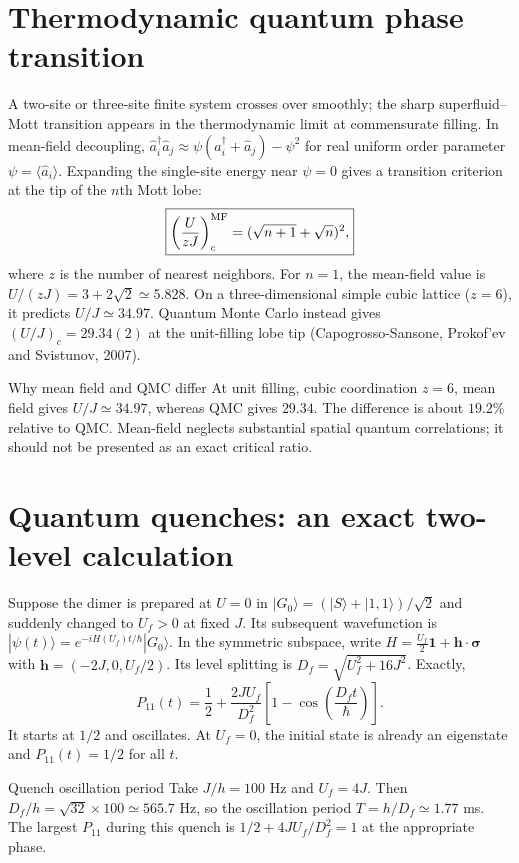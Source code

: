 \documentclass[11pt,a4paper]{article}
\begin{document}
\section{Thermodynamic quantum phase transition}
A two-site or three-site finite system crosses over smoothly; the sharp superfluid--Mott transition appears in the thermodynamic limit at commensurate filling. In mean-field decoupling, $\hat a_i^\dagger\hat a_j\approx\psi(\hat a_i^\dagger+\hat a_j)-\psi^2$ for real uniform order parameter $\psi=\langle\hat a_i\rangle$. Expanding the single-site energy near $\psi=0$ gives a transition criterion at the tip of the $n$th Mott lobe:
\begin{equation}\boxed{\left(\frac{U}{zJ}\right)^{\rm MF}_{c}=(\sqrt{n+1}+\sqrt n)^2,}\end{equation}
where $z$ is the number of nearest neighbors. For $n=1$, the mean-field value is $U/(zJ)=3+2\sqrt2\simeq5.828$. On a three-dimensional simple cubic lattice ($z=6$), it predicts $U/J\simeq34.97$. Quantum Monte Carlo instead gives $(U/J)_c=29.34(2)$ at the unit-filling lobe tip (Capogrosso-Sansone, Prokof'ev and Svistunov, 2007).
\begin{worked}{Why mean field and QMC differ}
At unit filling, cubic coordination $z=6$, mean field gives $U/J\simeq34.97$, whereas QMC gives $29.34$. The difference is about $19.2\%$ relative to QMC. Mean-field neglects substantial spatial quantum correlations; it should not be presented as an exact critical ratio.
\end{worked}
\section{Quantum quenches: an exact two-level calculation}
Suppose the dimer is prepared at $U=0$ in $|G_0\rangle=(|S\rangle+|1,1\rangle)/\sqrt2$ and suddenly changed to $U_f>0$ at fixed $J$. Its subsequent wavefunction is $|\psi(t)\rangle=e^{-iH(U_f)t/\hbar}|G_0\rangle$. In the symmetric subspace, write $H=\tfrac{U_f}{2}\mathbf1+\mathbf h\cdot\boldsymbol\sigma$ with $\mathbf h=(-2J,0,U_f/2)$. Its level splitting is $D_f=\sqrt{U_f^2+16J^2}$. Exactly,
\begin{equation}\boxed{P_{11}(t)=\frac12+\frac{2JU_f}{D_f^2}\left[1-\cos\left(\frac{D_f t}{\hbar}\right)\right].}\end{equation}
It starts at $1/2$ and oscillates. At $U_f=0$, the initial state is already an eigenstate and $P_{11}(t)=1/2$ for all $t$.
\begin{worked}{Quench oscillation period}
Take $J/h=100$ Hz and $U_f=4J$. Then $D_f/h=\sqrt{32}\times100\simeq565.7$ Hz, so the oscillation period $T=h/D_f\simeq1.77$ ms. The largest $P_{11}$ during this quench is $1/2+4JU_f/D_f^2=1$ at the appropriate phase.
\end{worked}
\end{document}
